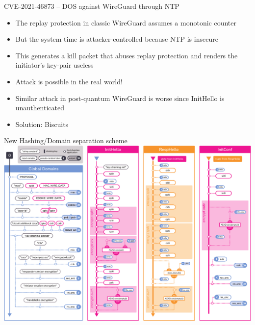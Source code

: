 \documentclass{rosenpass-beamer}
\begin{document}
\begin{frame}{CVE-2021-46873 – DOS against WireGuard through NTP}
\begin{itemize}
  \item The replay protection in classic WireGuard assumes a monotonic counter
  \item But the system time is attacker-controlled because NTP is insecure
  \item This generates a kill packet that abuses replay protection and renders the initiator's key-pair useless
  \item Attack is possible in the real world!
  \item Similar attack in post-quantum WireGuard is worse since InitHello is unauthenticated
  \item Solution: Biscuits
\end{itemize}
\end{frame}

\begin{frame}{New Hashing/Domain separation scheme}
  \includegraphics[height=.9\textheight]{graphics/rosenpass-wp-hashing-tree.pdf}
\end{frame}
\end{document}
